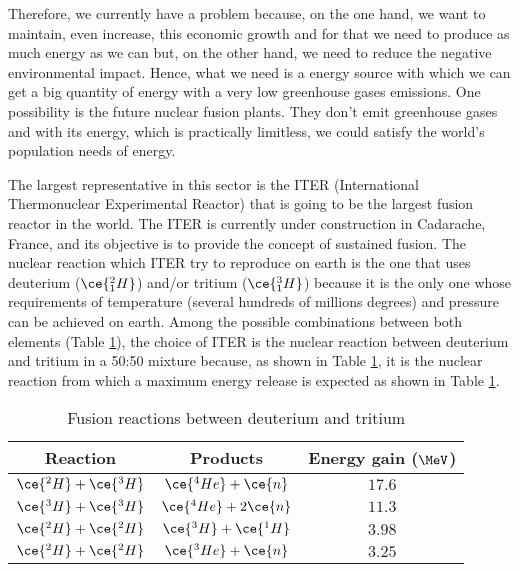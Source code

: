 Therefore, we currently have a problem because, on the one hand, we want to maintain, even increase, this economic growth and for that we need to produce as much energy as we can but, on the other hand, we need to reduce the negative environmental impact. Hence, what we need is a energy source with which we can get a big quantity of energy with a very low greenhouse gases emissions. One possibility is the future nuclear fusion plants. They don't emit greenhouse gases and with its energy, which is practically limitless, we could satisfy the world's population needs of energy.

The largest representative in this sector is the ITER \cite{ITER} (International Thermonuclear Experimental Reactor) that is going to be the largest fusion reactor in the world. The ITER is currently under construction in Cadarache, France, and its objective is to provide the concept of sustained fusion. The nuclear reaction which ITER try to reproduce on earth is the one that uses deuterium ($\ce{^{2}_{1}H}$) and/or tritium ($\ce{^{3}_{1}H}$) because it is the only one whose requirements of temperature (several hundreds of millions degrees) and pressure can be achieved on earth. Among the possible combinations between both elements (Table \ref{tab:FusionReactions}), the choice of ITER is the nuclear reaction between deuterium and tritium in a 50:50 mixture because, as shown in Table \ref{tab:FusionReactions},  it is the nuclear reaction from which a maximum energy release is expected as shown in Table \ref{tab:FusionReactions}.

\begin{table}[htbp]
\begin{center}
\begin{tabular}{|c|c|c|}
\hline
Reaction & Products & Energy gain ($\MeV$) \\
\hline \hline \hline
$\ce{^{2}H}+\ce{^{3}H}$ & $\ce{^{4}He}+\ce{n}$ & $17.6$ \\ \hline
$\ce{^{3}H}+\ce{^{3}H}$ & $\ce{^{4}He}+2\ce{n}$ & $11.3$ \\ \hline
$\ce{^{2}H}+\ce{^{2}H}$ & $\ce{^{3}H}+\ce{^{1}H}$ & $3.98$ \\ \hline
$\ce{^{2}H}+\ce{^{2}H}$ & $\ce{^{3}He}+\ce{n}$ & $3.25$ \\ \hline
\end{tabular}
\caption{Fusion reactions between deuterium and tritium\cite{TritiumDocument}}
\label{tab:FusionReactions}
\end{center}
\end{table}

